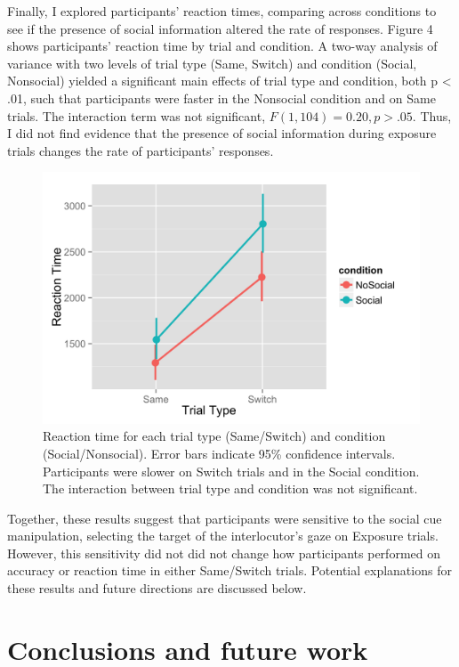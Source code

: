 \documentclass[10pt,letterpaper]{article}
\begin{document}
Finally, I explored participants' reaction times, comparing across conditions to see if the presence of social information altered the rate of responses. Figure 4 shows participants' reaction time by trial and condition. A two-way analysis of variance with two levels of trial type (Same, Switch) and condition (Social, Nonsocial) yielded a significant main effects of trial type and condition, both p < .01, such that participants were faster in the Nonsocial condition and on Same trials. The interaction term was not significant, $F(1, 104) = 0.20, p > .05$.  Thus, I did not find evidence that the presence of social information during exposure trials changes the rate of participants' responses. 

\begin{figure}[H]
	\centering
	\includegraphics[scale=0.15]{rt.png}
	\caption{Reaction time for each trial type (Same/Switch) and condition (Social/Nonsocial). Error bars indicate 95\% confidence intervals. Participants were slower on Switch trials and in the Social condition. The interaction between trial type and condition was not significant.}
\end{figure} 

Together, these results suggest that participants were sensitive to the social cue manipulation, selecting the target of the interlocutor's gaze on Exposure trials. However, this sensitivity did not did not change how participants performed on accuracy or reaction time in either Same/Switch trials. Potential explanations for these results and future directions are discussed below. 

\section{Conclusions and future work}
\end{document}
